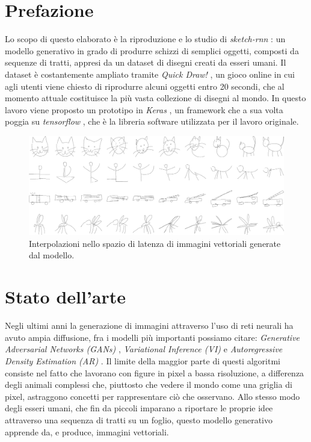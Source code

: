 \section{Prefazione}
\label{sec:prefazione}
Lo scopo di questo elaborato è la riproduzione e lo studio di \textit{sketch-rnn} \cite{sketchrnn}: un modello generativo in grado di produrre schizzi di semplici oggetti, composti da sequenze di tratti, appresi da un dataset di disegni creati da esseri umani. Il dataset è costantemente ampliato tramite \textit{Quick Draw!} \cite{quickdraw}, un gioco online in cui agli utenti viene chiesto di riprodurre alcuni oggetti entro 20 secondi, che al momento attuale costituisce la più vasta collezione di disegni al mondo. In questo lavoro viene proposto un prototipo in \textit{Keras} \cite{keras}, un framework che a sua volta poggia su \textit{tensorflow} \cite{tensorflow}, che è la libreria software utilizzata per il lavoro originale.
\begin{figure}[ht]
	\centering
	\includegraphics[width=\linewidth]{img/sketch_rnn_latent.png}
	\caption{Interpolazioni nello spazio di latenza di immagini vettoriali generate dal modello.}
	\label{fig:1.1}
\end{figure}
\section{Stato dell'arte}
Negli ultimi anni la generazione di immagini attraverso l'uso di reti neurali ha avuto ampia diffusione, fra i modelli più importanti possiamo citare: \textit{Generative Adversarial Networks (GANs)} \cite{GAN}, \textit{Variational Inference (VI)} \cite{VI} e \textit{Autoregressive Density Estimation (AR)} \cite{AR}. Il limite della maggior parte di questi algoritmi consiste nel fatto che lavorano con figure in pixel a bassa risoluzione, a differenza degli animali complessi che, piuttosto che vedere il mondo come una griglia di pixel, astraggono concetti per rappresentare ciò che osservano. Allo stesso modo degli esseri umani, che fin da piccoli imparano a riportare le proprie idee attraverso una sequenza di tratti su un foglio, questo modello generativo apprende da, e produce, immagini vettoriali.

